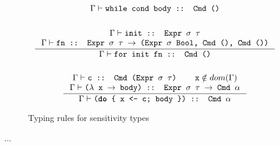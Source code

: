 \documentclass[10pt, conference]{IEEEtran}
\newcommand{\ttt}{\texttt}
\newcommand{\rarr}{\rightarrow}
\begin{document}
\begin{figure}[h]
{\begin{minipage}{\linewidth}
\begin{gather*}
    {\Gamma \vdash \ttt{while cond body :: Cmd ()}}\\
  \\
  \inference{%
    \Gamma \vdash \ttt{init :: Expr $\sigma$ $\tau$}\\
    \Gamma \vdash \ttt{fn :: Expr $\sigma$ $\tau$ $\rarr$ (Expr $\sigma$ Bool, Cmd (), Cmd ())}
    }{\Gamma \vdash \ttt{for init fn :: Cmd ()}}\\
  \\
  \inference{%
    \Gamma \vdash \ttt{c :: Cmd (Expr $\sigma$ $\tau$)}
    & \ttt{x} \notin dom(\Gamma)
    \\ \Gamma \vdash \ttt{($\lambda$ x $\rarr$ body) :: Expr $\sigma$ $\tau$ $\rarr$ Cmd $\alpha$}
  }{%
    \Gamma \vdash \ttt{(\textbf{do} \{ x <- c; body \}) :: Cmd $\alpha$}
  }
\end{gather*}
\end{minipage}}
  \caption{Typing rules for sensitivity types}
\label{fig:SensTypes}
\end{figure}

...
\end{document}
